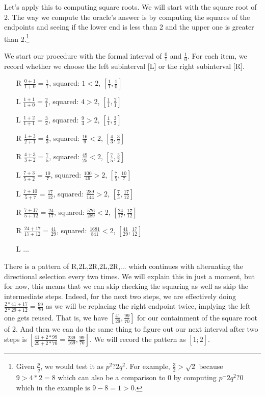 \documentclass[12pt]{article}
\theoremstyle{remark}
\begin{document}
Let's apply this to computing square roots. We will start with the square root of 2. The way we compute the oracle's answer is by computing the squares of the endpoints and seeing if the lower end is less than 2 and the upper one is greater than 2.\footnote{Given $\frac{p}{q}$, we would test it as $p^2 ? 2q^2$. For example, $\frac{3}{2} > \sqrt{2}$ because $9 > 4*2 = 8$ which can also be a comparison to 0 by computing $p^-2q^2? 0$ which in the example is $9-8=1 > 0$.}

We start our procedure with the formal interval of $\tfrac{0}{1}$ and $\tfrac{1}{0}$. For each item, we record whether we choose the left subinterval [L] or the right subinterval [R]. 


\begin{itemize}
    \item[R] $\tfrac{0+1}{1+0} = \tfrac{1}{1}$, squared: $1 < 2$,  $[\tfrac{1}{1},\tfrac{1}{0}] $
    \item[L] $\tfrac{1+1}{1+0} = \tfrac{2}{1}$, squared: $4 > 2$, $[\tfrac{1}{1},\tfrac{2}{1}]$
    \item[L] $\tfrac{1+2}{1+1} = \tfrac{3}{2}$, squared: $\tfrac{9}{4} > 2$, $[\tfrac{1}{1},\tfrac{3}{2}]$
    \item[R] $\tfrac{1+3}{2+1} = \tfrac{4}{3}$, squared: $\tfrac{16}{9} < 2$, $[\tfrac{4}{3},\tfrac{3}{2}]$
    \item[R] $\tfrac{4+3}{3+2} = \tfrac{7}{5}$, squared: $\tfrac{49}{25} < 2$, 
    $[\tfrac{7}{5},\tfrac{3}{2}]$
    \item[L] $\tfrac{7+3}{5+2} = \tfrac{10}{7}$, squared: $\tfrac{100}{49} > 2$, 
    $[\tfrac{7}{5},\tfrac{10}{7}]$
    \item[L] $\tfrac{7+10}{5+7} = \tfrac{17}{12}$, squared: $\tfrac{289}{144} > 2$, 
    $[\tfrac{7}{5},\tfrac{17}{12}]$
    \item[R] $\tfrac{7+17}{5+12} = \tfrac{24}{17}$, squared: $\tfrac{576}{289} < 2$, 
    $[\tfrac{24}{17},\tfrac{17}{12}]$
    \item[R] $\tfrac{24+17}{17+12} = \tfrac{41}{29}$, squared: $\tfrac{1681}{841} < 2$, 
    $[\tfrac{41}{29},\tfrac{17}{12}]$
    \item[L] $\ldots$
\end{itemize}

There is a pattern of R,2L,2R,2L,2R,$\ldots$ which continues with alternating the directional selection every two times. We will explain this in just a moment, but for now, this means that we can skip checking the squaring as well as skip the intermediate steps. Indeed, for the next two steps, we are effectively doing $\tfrac{2*41 + 17}{2*29 + 12} = \tfrac{99}{70}$ as we will be replacing the right endpoint twice, implying the left one gets reused. That is, we have $[\tfrac{41}{29}, \tfrac{99}{70}]$ for our containment of the square root of 2. And then we can do the same thing to figure out our next interval after two steps is $[\tfrac{41+2*99}{29+2*70}=\tfrac{239}{169}, \tfrac{99}{70}]$. We will record the pattern as $[1; \bar{2}]$.
\end{document}
